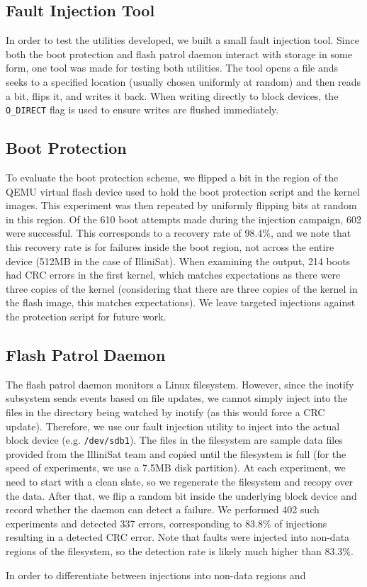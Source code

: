 \subsection{Fault Injection Tool}

In order to test the utilities developed, we built a small fault injection
tool.  Since both the boot protection and flash patrol daemon interact with
storage in some form, one tool was made for testing both utilities.  The tool
opens a file ands seeks to a specified location (usually chosen uniformly at
random) and then reads a bit, flips it, and writes it back.  When writing
directly to block devices, the {\texttt {O\_DIRECT}} flag is used to ensure
writes are flushed immediately.

\subsection{Boot Protection}
To evaluate the boot protection scheme, we flipped a bit in the region of the
QEMU virtual flash device used to hold the boot protection script and the kernel
images.  This experiment was then repeated by uniformly flipping bits at random
in this region.  Of the 610 boot attempts made during the injection campaign,
602 were successful.  This corresponds to a recovery rate of 98.4\%, and we note
that this recovery rate is for failures inside the boot region, not across the
entire device (512MB in the case of IlliniSat).  When examining the output, 214
boots had CRC errors in the first kernel, which matches expectations as there
were three copies of the kernel (considering that there are three copies of the
kernel in the flash image, this matches expectations).  We leave targeted
injections against the protection script for future work.

\subsection{Flash Patrol Daemon}
The flash patrol daemon monitors a Linux filesystem.  However, since the
inotify subsystem sends events based on file updates, we cannot simply
inject into the files in the directory being watched by inotify (as this would
force a CRC update). Therefore, we use our fault injection utility to inject
into the actual block device (e.g.  \texttt{/dev/sdb1}).  The files in the
filesystem are sample data files provided from the IlliniSat team and copied
until the filesystem is full (for the speed of experiments, we use a 7.5MB disk
partition).  At each experiment, we need to start with a clean slate, so we
regenerate the filesystem and recopy over the data.  After that, we flip a
random bit inside the underlying block device and record whether the daemon can
detect a failure.  We performed 402 such experiments and detected 337 errors,
corresponding to 83.8\% of injections resulting in a detected CRC error.
Note that faults were injected into non-data regions of the filesystem, so the
detection rate is likely much higher than 83.3\%.

In order to differentiate between injections into non-data regions and 
